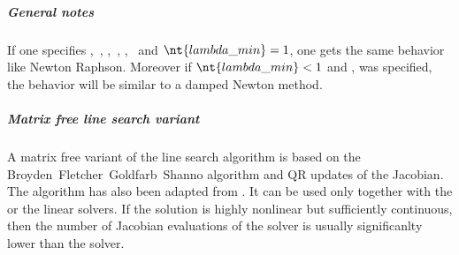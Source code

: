 \subparagraph{General notes}
If one specifies ,~, ,~, ,~ and $\nt{lambda\_min}=1$, one gets the same behavior like Newton Raphson. Moreover if $\nt{lambda\_min}<1$ and ,  was specified, the behavior will be similar to a damped Newton method.

\subparagraph{Matrix free line search variant}
A matrix free variant of the line search algorithm is based on the Broyden~Fletcher~Goldfarb~Shanno
algorithm and QR updates of the Jacobian. The  algorithm has also been adapted from \cite{NUMERICAL-RECIPES-IN-C}.
It can be used only together with the  or the  linear solvers. If the solution is highly nonlinear but
sufficiently continuous, then the number of Jacobian evaluations of the  solver is usually significanlty lower
than the  solver.

